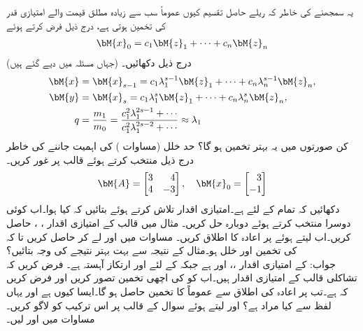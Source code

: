 \quad
یہ سمجھنے کی خاطر کہ ریلے حاصل تقسیم  کیوں عموماً  سب سے زیادہ مطلق قیمت والے امتیازی قدر  کی تخمین  ہوتی ہے، درج ذیل فرض کرتے ہوئے
\begin{align*}
\bM{x}_0=c_1\bM{z}_1+\cdots+c_n\bM{z}_n
\end{align*}
(جہاں   مسئلہ  میں دیے گئے ہیں) درج ذیل دکھائیں۔
\begin{align*}
\bM{x}&=\bM{x}_{s-1}=c_1\lambda_1^{s-1}\bM{z}_1+\cdots+c_n\lambda_n^{s-1}\bM{z}_n,\\
\bM{y}&=\bM{x}_s=c_1\lambda_1^s\bM{z}_1+\cdots+c_n\lambda_n^s\bM{z}_n,\\
q&=\frac{m_1}{m_0}=\frac{c_1^2\lambda_1^{2s-1}+\cdots}{c_1^2\lambda_1^{2s-2}+\cdots}\approx \lambda_1
\end{align*}
کن صورتوں میں یہ بہتر تخمین ہو گا؟
\quad
حد خلل (مساوات ) کی اہمیت جاننے کی خاطر درج ذیل  منتخب کرتے ہوئے قالب  پر غور کریں۔ 
\begin{align*}
\bM{A}=\begin{bmatrix*}[r]3&4\\4&-3  \end{bmatrix*}, \quad \bM{x}_0=\begin{bmatrix*}[r] 3\\-1  \end{bmatrix*}
\end{align*}
دکھائیں کہ تمام  کے لئے  ہے۔امتیازی اقدار تلاش کرتے ہوئے بتائیں کہ کیا ہوا۔اب کوئی دوسرا  منتخب کرتے ہوئے دوبارہ حل کریں۔
\quad
مثال  میں قالب  کے امتیازی اقدار ، ،  حاصل کریں۔اب  لیتے ہوئے   پر اعادہ کا اطلاق کریں۔ مساوات  میں  اور  لے کر  حاصل کریں تا کہ  کی تخمین  اور خلل  ہو۔مثال  کے نتیجہ سے بہت بہتر نتیجے کی وجہ بتائیں؟ \\
جواب:\quad
{} کے امتیازی اقدار ،،  اور  ہے جبکہ  کے لئے  اور ارتکاز آہستہ ہے۔ 
\quad
فرض کریں کہ تشاکلی قالب  کے امتیازی اقدار  ہیں۔اب  کو  کی اچھی تخمین تصور کریں   اور فرض کریں کہ  ہے۔تب  پر اعادہ کی اطلاق سے عموماً  کا تخمین حاصل ہو گا۔ایسا کیوں ہے اور یہاں لفظ  سے   کیا مراد ہے؟  اور  لیتے ہوئے سوال  کے قالب  پر اس ترکیب کو لاگو کریں۔ مساوات  میں  اور  لیں۔
